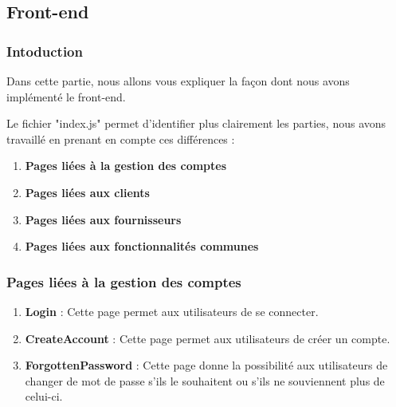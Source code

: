 \subsection{Front-end}
\subsubsection{Intoduction}
\begin{flushleft}
Dans cette partie, nous allons vous expliquer la façon dont nous avons implémenté le front-end.
\end{flushleft}
\begin{flushleft}
Le fichier "index.js" permet d'identifier plus clairement les parties, nous avons travaillé en prenant en compte ces différences : 
\end{flushleft}
\begin{enumerate}[-]
\item \textbf{Pages liées à la gestion des comptes}
\item \textbf{Pages liées aux clients}
\item \textbf{Pages liées aux fournisseurs}
\item \textbf{Pages liées aux fonctionnalités communes}
\end{enumerate} 
\newpage
\subsubsection{Pages liées à la gestion des comptes}
\begin{enumerate}
\item \textbf{Login} :\newline
Cette page permet aux utilisateurs de se connecter.
\item \textbf{CreateAccount} :\newline
Cette page permet aux utilisateurs de créer un compte.
\item \textbf{ForgottenPassword} :\newline
Cette page donne la possibilité aux utilisateurs de changer de mot de passe s'ils le souhaitent ou s'ils ne souviennent plus de celui-ci.
\end{enumerate}


